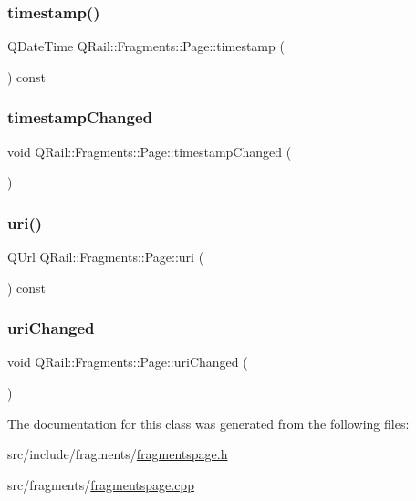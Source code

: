 \subsubsection{\texorpdfstring{timestamp()}{timestamp()}}
{\footnotesize\ttfamily Q\+Date\+Time Q\+Rail\+::\+Fragments\+::\+Page\+::timestamp (\begin{DoxyParamCaption}{ }\end{DoxyParamCaption}) const}

\mbox{\label{classQRail_1_1Fragments_1_1Page_ad20cb20db04844c84f6c5b5217b6742c}} 
\subsubsection{\texorpdfstring{timestampChanged}{timestampChanged}}
{\footnotesize\ttfamily void Q\+Rail\+::\+Fragments\+::\+Page\+::timestamp\+Changed (\begin{DoxyParamCaption}{ }\end{DoxyParamCaption})\hspace{0.3cm}{\ttfamily [signal]}}

\mbox{\label{classQRail_1_1Fragments_1_1Page_a55b83d498119763fb6218ccb0959967e}} 
\subsubsection{\texorpdfstring{uri()}{uri()}}
{\footnotesize\ttfamily Q\+Url Q\+Rail\+::\+Fragments\+::\+Page\+::uri (\begin{DoxyParamCaption}{ }\end{DoxyParamCaption}) const}

\mbox{\label{classQRail_1_1Fragments_1_1Page_a87f9b4f40af2e858ea3e046a2107631e}} 
\subsubsection{\texorpdfstring{uriChanged}{uriChanged}}
{\footnotesize\ttfamily void Q\+Rail\+::\+Fragments\+::\+Page\+::uri\+Changed (\begin{DoxyParamCaption}{ }\end{DoxyParamCaption})\hspace{0.3cm}{\ttfamily [signal]}}



The documentation for this class was generated from the following files\+:\begin{DoxyCompactItemize}
\item 
src/include/fragments/\mbox{\hyperlink{fragmentspage_8h}{fragmentspage.\+h}}\item 
src/fragments/\mbox{\hyperlink{fragmentspage_8cpp}{fragmentspage.\+cpp}}\end{DoxyCompactItemize}
